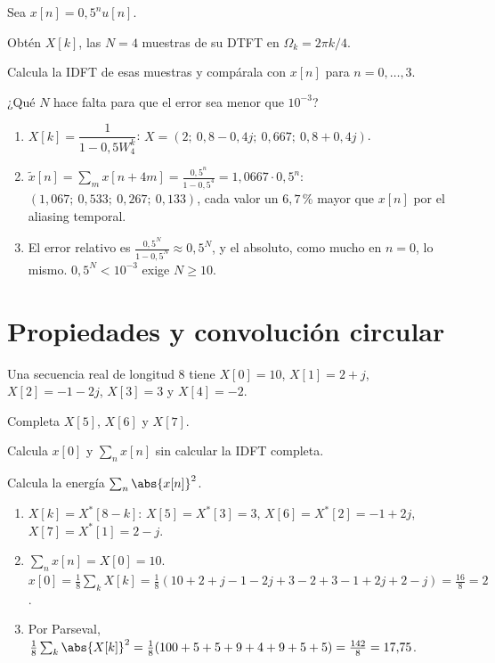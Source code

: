 \documentclass[11pt,a4paper]{scrartcl}
\begin{document}
\begin{ejercicio}
  Sea $x[n]=0{,}5^nu[n]$.
  \begin{incisos}[1]
    \item Obtén $X[k]$, las $N=4$ muestras de su DTFT en $\Omega_k=2\pi k/4$.
    \item Calcula la IDFT de esas muestras y compárala con $x[n]$ para $n=0,\dots,3$.
    \item ¿Qué $N$ hace falta para que el error sea menor que $10^{-3}$?
  \end{incisos}
\end{ejercicio}
\begin{solucion}
  \begin{enumerate}[label=\alph*)]
    \item $X[k]=\dfrac{1}{1-0{,}5W_4^k}$: $X=(2;\ 0{,}8-0{,}4j;\ 0{,}667;\ 0{,}8+0{,}4j)$.
    \item $\tilde x[n]=\sum_mx[n+4m]=\frac{0{,}5^n}{1-0{,}5^4}=1{,}0667\cdot0{,}5^n$: $(1{,}067;\ 0{,}533;\ 0{,}267;\ 0{,}133)$, cada valor un $6{,}7$\,\% mayor que $x[n]$ por el aliasing temporal.
    \item El error relativo es $\frac{0{,}5^N}{1-0{,}5^N}\approx0{,}5^N$, y el absoluto, como mucho en $n=0$, lo mismo. $0{,}5^N<10^{-3}$ exige $N\ge10$.
  \end{enumerate}
\end{solucion}

\section*{Propiedades y convolución circular}

\begin{ejercicio}
  Una secuencia real de longitud 8 tiene $X[0]=10$, $X[1]=2+j$, $X[2]=-1-2j$, $X[3]=3$ y $X[4]=-2$.
  \begin{incisos}[1]
    \item Completa $X[5]$, $X[6]$ y $X[7]$.
    \item Calcula $x[0]$ y $\sum_nx[n]$ sin calcular la IDFT completa.
    \item Calcula la energía $\sum_n\abs{x[n]}^2$.
  \end{incisos}
\end{ejercicio}
\begin{solucion}
  \begin{enumerate}[label=\alph*)]
    \item $X[k]=X^*[8-k]$: $X[5]=X^*[3]=3$, $X[6]=X^*[2]=-1+2j$, $X[7]=X^*[1]=2-j$.
    \item $\sum_nx[n]=X[0]=10$. $x[0]=\frac18\sum_kX[k]=\frac18(10+2+j-1-2j+3-2+3-1+2j+2-j)=\frac{16}{8}=2$.
    \item Por Parseval, $\frac18\sum_k\abs{X[k]}^2=\frac18(100+5+5+9+4+9+5+5)=\frac{142}8=17{,}75$.
  \end{enumerate}
\end{solucion}
\end{document}
